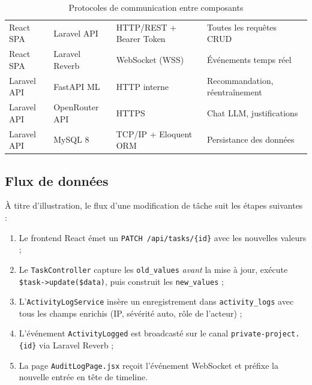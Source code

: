\begin{table}[H]
  \centering
  \caption{Protocoles de communication entre composants}
  \label{tab:comms}
  \begin{tabularx}{\textwidth}{L{3cm}L{3cm}L{3cm}X}
    \toprule
     &  &  &  \\
    \midrule
    React SPA      & Laravel API    & HTTP/REST + Bearer Token & Toutes les requêtes CRUD \\
    React SPA      & Laravel Reverb & WebSocket (WSS)          & Événements temps réel \\
    Laravel API    & FastAPI ML     & HTTP interne             & Recommandation, réentraînement \\
    Laravel API    & OpenRouter API & HTTPS                    & Chat LLM, justifications \\
    Laravel API    & MySQL 8        & TCP/IP + Eloquent ORM    & Persistance des données \\
    \bottomrule
  \end{tabularx}
\end{table}

\subsection{Flux de données}

À titre d'illustration, le flux d'une modification de tâche suit les étapes
suivantes :

\begin{enumerate}
  \item Le frontend React émet un \texttt{PATCH /api/tasks/\{id\}} avec les nouvelles
        valeurs ;
  \item Le \texttt{TaskController} capture les \texttt{old\_values} \textit{avant}
        la mise à jour, exécute \texttt{\$task->update(\$data)}, puis construit
        les \texttt{new\_values} ;
  \item L'\texttt{ActivityLogService} insère un enregistrement dans
        \texttt{activity\_logs} avec tous les champs enrichis (IP, sévérité auto,
        rôle de l'acteur) ;
  \item L'événement \texttt{ActivityLogged} est broadcasté sur le canal
        \texttt{private-project.\{id\}} via Laravel Reverb ;
  \item La page \texttt{AuditLogPage.jsx} reçoit l'événement WebSocket et
        préfixe la nouvelle entrée en tête de timeline.
\end{enumerate}

